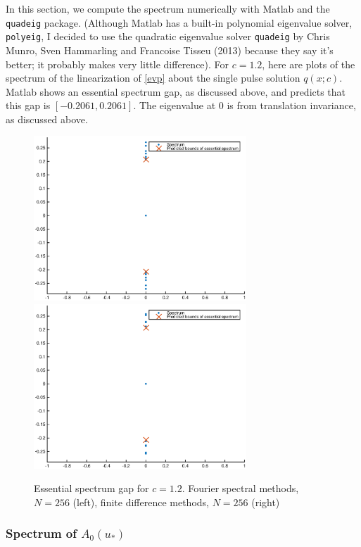 \documentclass[12pt]{article}
\begin{document}
In this section, we compute the spectrum numerically with Matlab and the \texttt{quadeig} package. (Although Matlab has a built-in polynomial eigenvalue solver, \texttt{polyeig}, I decided to use the quadratic eigenvalue solver \texttt{quadeig} by Chris Munro, Sven Hammarling and Francoise Tisseu (2013) because they say it's better; it probably makes very little difference). For $c = 1.2$, here are plots of the spectrum of the linearization of \eqref{evp} about the single pulse solution $q(x; c)$. Matlab shows an essential spectrum gap, as discussed above, and predicts that this gap is $[-0.2061, 0.2061]$. The eigenvalue at 0 is from translation invariance, as discussed above.

\begin{figure}[H]
\centering
\includegraphics[width=8cm]{essspecboundsF256.eps}
\includegraphics[width=8cm]{essspecboundsFD256.eps}
\caption{Essential spectrum gap for $c = 1.2$. Fourier spectral methods, $N = 256$ (left), finite difference methods, $N = 256$ (right)}
\end{figure}

\subsubsection{\texorpdfstring{Spectrum of $A_0(u_*)$}{}}
\end{document}
